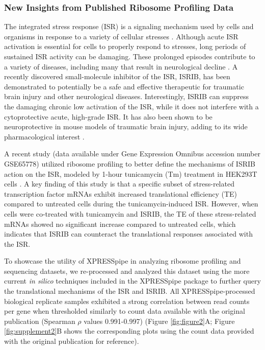 \documentclass[10pt, oneside]{article}
\begin{document}
\subsubsection{New Insights from Published Ribosome Profiling Data}
The integrated stress response (ISR) is a signaling mechanism used by cells and organisms in response to a variety of cellular stresses \cite{harding_isr}. Although acute ISR activation is essential for cells to properly respond to stresses, long periods of sustained ISR activity can be damaging. These prolonged episodes contribute to a variety of diseases, including many that result in neurological decline \cite{isr_disease}. A recently discovered small-molecule inhibitor of the ISR, ISRIB, has been demonstrated to potentially be a safe and effective therapeutic for traumatic brain injury and other neurological diseases. Interestingly, ISRIB can suppress the damaging chronic low activation of the ISR, while it does not interfere with a cytoprotective acute, high-grade ISR. It has also been shown to be neuroprotective in mouse models of traumatic brain injury, adding to its wide pharmacological interest \cite{isrib_activation, isrib_structure, isrib_riboseq, isrib_neuroprotective, isrib_neuroprotective2, isrib_neuroprotective3, isrib_neuroprotective4}. \par

A recent study (data available under Gene Expression Omnibus accession number GSE65778) utilized ribosome profiling to better define the mechanisms of ISRIB action on the ISR, modeled by 1-hour tunicamycin (Tm) treatment in HEK293T cells \cite{isrib_riboseq}. A key finding of this study is that a specific subset of stress-related transcription factor mRNAs exhibit increased translational efficiency (TE) compared to untreated cells during the tunicamycin-induced ISR. However, when cells were co-treated with tunicamycin and ISRIB, the TE of these stress-related mRNAs showed no significant increase compared to untreated cells, which indicates that ISRIB can counteract the translational responses associated with the ISR. \par

To showcase the utility of XPRESSpipe in analyzing ribosome profiling and sequencing datasets, we re-processed and analyzed this dataset using the more current \textit{in silico} techniques included in the XPRESSpipe package to further query the translational mechanisms of the ISR and ISRIB. All XPRESSpipe-processed biological replicate samples exhibited a strong correlation between read counts per gene when thresholded similarly to count data available with the original publication (Spearman $\rho$ values 0.991-0.997) (Figure \ref{fig:figure2}A; Figure \ref{fig:supplement2}B shows the corresponding plots using the count data provided with the original publication for reference). \par
\end{document}

